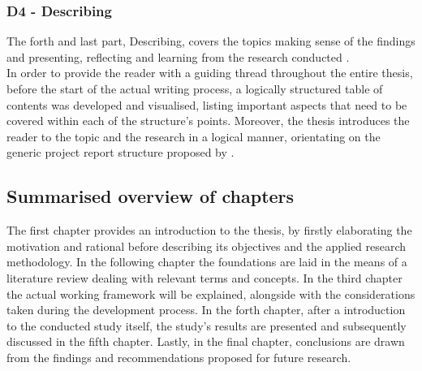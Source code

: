 \subsubsection{D4 - Describing}
The forth and last part, Describing, covers the topics making sense of the findings and presenting, reflecting and learning from the research conducted \cite{maylor17}. \\
In order to provide the reader with a guiding thread throughout the entire thesis, before the start of the actual writing process, a logically structured table of contents was developed and visualised, listing important aspects that need to be covered within each of the structure's points. Moreover, the thesis introduces the reader to the topic and the research in a logical manner, orientating on the generic project report structure proposed by .

\subsection{Summarised overview of chapters}
The first chapter provides an introduction to the thesis, by firstly elaborating the motivation and rational before describing its objectives and the applied research methodology. In the following chapter the foundations are laid in the means of a literature review dealing with relevant terms and concepts. In the third chapter the actual working framework will be explained, alongside with the considerations taken during the development process. In the forth chapter, after a introduction to the conducted study itself, the study's results are presented and subsequently discussed in the fifth chapter. Lastly, in the final chapter, conclusions are drawn from the findings and recommendations proposed for future research.
